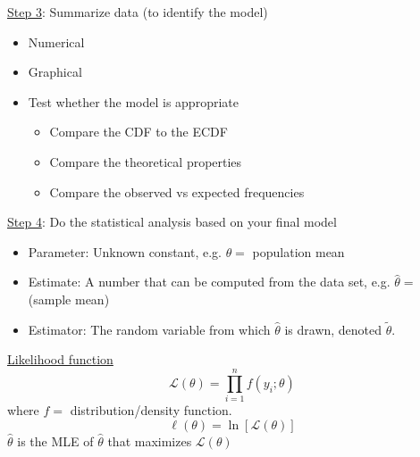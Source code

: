 \underline{Step 3}: Summarize data (to identify the model)
\begin{itemize}
    \item Numerical
    \item Graphical
    \item Test whether the model is appropriate
          \begin{itemize}
              \item Compare the CDF to the ECDF
              \item Compare the theoretical properties
              \item Compare the observed vs expected frequencies
          \end{itemize}
\end{itemize}

\underline{Step 4}: Do the statistical analysis based on your final model
\begin{itemize}
    \item Parameter: Unknown constant, e.g. $ \theta= $ population mean
    \item Estimate: A number that can be computed from the data set, e.g.
          $ \hat{\theta}= $ (sample mean)
    \item Estimator: The random variable from which $ \hat{\theta} $ is drawn,
          denoted $ \tilde{\theta} $.
\end{itemize}

\underline{Likelihood function}
\[ \mathcal{L}(\theta)=\prod_{i=1}^n f(y_i;\theta) \]
where $ f= $ distribution/density function.
\[ \ell(\theta)=\ln\left[ \mathcal{L}(\theta) \right] \]
$ \hat{\theta} $ is the MLE of $ \hat{\theta} $ that maximizes $ \mathcal{L}(\theta) $

